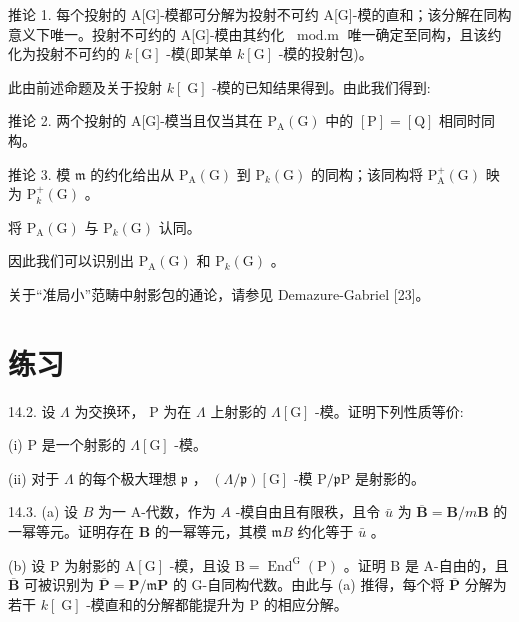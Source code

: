 \documentclass[10pt]{article}
\begin{document}
推论 1. 每个投射的 A[G]-模都可分解为投射不可约 A[G]-模的直和；该分解在同构意义下唯一。投射不可约的 A[G]-模由其约化 \({\;\operatorname{mod.m}}\) 唯一确定至同构，且该约化为投射不可约的 \(k\left\lbrack  \mathrm{G}\right\rbrack\) -模(即某单 \(k\left\lbrack  \mathrm{G}\right\rbrack\) -模的投射包)。

此由前述命题及关于投射 \(k\left\lbrack  \mathrm{\;G}\right\rbrack\) -模的已知结果得到。由此我们得到:

推论 2. 两个投射的 A[G]-模当且仅当其在 \({\mathrm{P}}_{\mathrm{A}}\left( \mathrm{G}\right)\) 中的 \(\left\lbrack  \mathrm{P}\right\rbrack   = \left\lbrack  \mathrm{Q}\right\rbrack\) 相同时同构。

推论 3. 模 \(\mathfrak{m}\) 的约化给出从 \({\mathrm{P}}_{\mathrm{A}}\left( \mathrm{G}\right)\) 到 \({\mathrm{P}}_{k}\left( \mathrm{G}\right)\) 的同构；该同构将 \({\mathrm{P}}_{\mathrm{A}}^{ + }\left( \mathrm{G}\right)\) 映为 \({\mathrm{P}}_{k}^{ + }\left( \mathrm{G}\right)\) 。

将 \({\mathrm{P}}_{\mathrm{A}}\left( \mathrm{G}\right)\) 与 \({\mathrm{P}}_{k}\left( \mathrm{G}\right)\) 认同。

因此我们可以识别出 \({\mathrm{P}}_{\mathrm{A}}\left( \mathrm{G}\right)\) 和 \({\mathrm{P}}_{k}\left( \mathrm{G}\right)\) 。

关于“准局小”范畴中射影包的通论，请参见 Demazure-Gabriel [23]。

\section*{练习}

14.2. 设 \(\Lambda\) 为交换环， \(\mathrm{P}\) 为在 \(\Lambda\) 上射影的 \(\Lambda \left\lbrack  \mathrm{G}\right\rbrack\) -模。证明下列性质等价:

(i) \(\mathrm{P}\) 是一个射影的 \(\Lambda \left\lbrack  \mathrm{G}\right\rbrack\) -模。

(ii) 对于 \(\Lambda\) 的每个极大理想 \(\mathfrak{p}\) ， \(\left( {\Lambda /\mathfrak{p}}\right) \left\lbrack  \mathrm{G}\right\rbrack\) -模 \(\mathrm{P}/\mathfrak{p}\mathrm{P}\) 是射影的。

14.3. (a) 设 \(B\) 为一 A-代数，作为 \(A\) -模自由且有限秩，且令 \(\bar{u}\) 为 \(\overline{\mathbf{B}} = \mathbf{B}/m\mathbf{B}\) 的一幂等元。证明存在 \(\mathbf{B}\) 的一幂等元，其模 \(\mathfrak{m}B\) 约化等于 \(\bar{u}\) 。

(b) 设 \(\mathrm{P}\) 为射影的 \(\mathrm{A}\left\lbrack  \mathrm{G}\right\rbrack\) -模，且设 \(\mathrm{B} = {\operatorname{End}}^{\mathrm{G}}\left( \mathrm{P}\right)\) 。证明 \(\mathrm{B}\) 是 A-自由的，且 \(\overline{\mathbf{B}}\) 可被识别为 \(\overline{\mathbf{P}} = \mathbf{P}/\mathfrak{m}\mathbf{P}\) 的 G-自同构代数。由此与 (a) 推得，每个将 \(\overline{\mathbf{P}}\) 分解为若干 \(k\left\lbrack  \mathrm{\;G}\right\rbrack\) -模直和的分解都能提升为 P 的相应分解。
\end{document}
